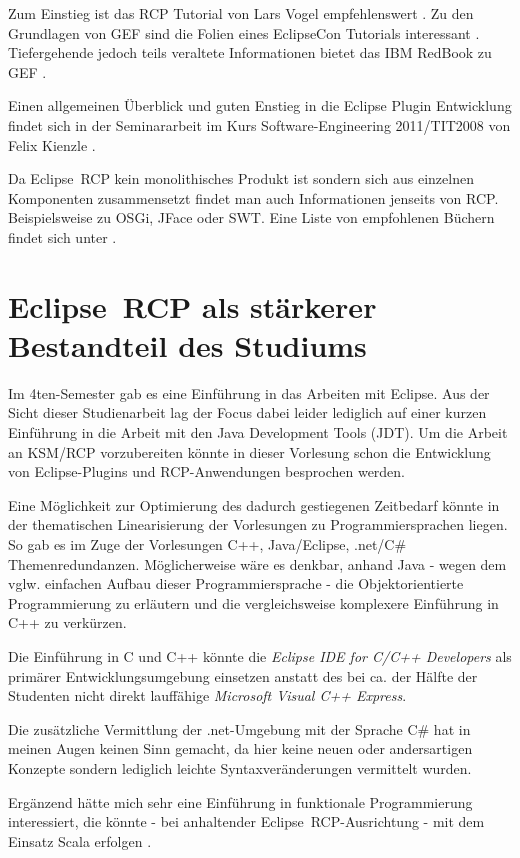 \documentclass[%
12pt,titlepage,abstracton,DIV=10,BCOR=0.5cm]{scrreprt}
\begin{document}
Zum Einstieg ist das RCP Tutorial von Lars Vogel empfehlenswert \cite{vogelrcp}.
Zu den Grundlagen von GEF sind die Folien eines EclipseCon Tutorials interessant
\cite{gefslides}. Tiefergehende jedoch teils veraltete Informationen bietet
das IBM RedBook zu GEF \cite{gefredbook}.

Einen allgemeinen Überblick und guten Enstieg in die Eclipse Plugin Entwicklung
findet sich in der Seminararbeit im Kurs Software-Engineering
2011/\textsc{TIT2008} von Felix Kienzle \cite{kienzle11}.

Da Eclipse~RCP kein monolithisches Produkt ist sondern sich aus einzelnen
Komponenten zusammensetzt findet man auch Informationen jenseits von RCP.
Beispielsweise zu OSGi\cite{bartlett}, JFace\cite{jfaceaction} oder SWT. Eine
Liste von empfohlenen Büchern findet sich unter \cite{eclipse-read}.

\section{Eclipse~RCP als stärkerer Bestandteil des Studiums}
Im 4ten-Semester gab es eine Einführung in das Arbeiten mit Eclipse. Aus der
Sicht dieser Studienarbeit lag der Focus dabei leider lediglich auf einer
kurzen Einführung in die Arbeit mit den Java Development Tools (JDT).
Um die Arbeit an KSM/RCP vorzubereiten könnte in dieser Vorlesung schon die
Entwicklung von Eclipse-Plugins und RCP-Anwendungen besprochen werden.

Eine Möglichkeit zur Optimierung des dadurch gestiegenen Zeitbedarf könnte in
der thematischen Linearisierung der Vorlesungen zu Programmiersprachen liegen.
So gab es im Zuge der Vorlesungen C++, Java/Eclipse, .net/C\#
 Themenredundanzen. Möglicherweise wäre es denkbar, anhand Java -
 wegen dem vglw. einfachen Aufbau
dieser Programmiersprache - die Objektorientierte Programmierung zu erläutern
und die vergleichsweise komplexere Einführung in C++ zu verkürzen.

Die Einführung in C und C++ könnte die \textit{Eclipse IDE for
C/C++ Developers} als primärer Entwicklungsumgebung einsetzen anstatt des bei
ca. der Hälfte der Studenten nicht direkt lauffähige \textit{Microsoft Visual
C++ Express}.

Die zusätzliche Vermittlung der .net-Umgebung mit der Sprache C\# hat in meinen
Augen keinen Sinn gemacht, da hier keine neuen oder andersartigen Konzepte
sondern lediglich leichte Syntaxveränderungen vermittelt wurden.

Ergänzend hätte mich sehr eine Einführung in funktionale Programmierung
interessiert, die könnte - bei anhaltender Eclipse~RCP-Ausrichtung - mit dem
Einsatz Scala erfolgen \cite{eclipse:scalabundle}\cite{eclipse:scalarcp}.
\end{document}

